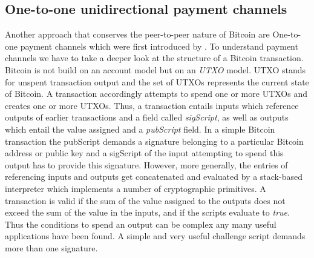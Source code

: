 \documentclass[10pt,journal,compsoc]{IEEEtran}
\begin{document}
\subsection{One-to-one unidirectional payment channels}
\label{sec:channels}
Another approach that conserves the peer-to-peer nature of Bitcoin are One-to-one payment channels which were first introduced by \cite{Hearn}. To understand payment channels we have to take a deeper look at the structure of a Bitcoin transaction. Bitcoin is not build on an account model but on an \emph{UTXO} model. UTXO stands for unspent transaction output and the set of UTXOs represents the current state of Bitcoin. A transaction accordingly attempts to spend one or more UTXOs and creates one or more UTXOs. Thus, a transaction entails inputs which reference outputs of earlier transactions and a field called \emph{sigScript}, as well as outputs which entail the value assigned and a \emph{pubScript} field. In a simple Bitcoin transaction the pubScript demands a signature belonging to a particular Bitcoin address or public key and a sigScript of the input attempting to spend this output has to provide this signature. However, more generally, the entries of referencing inputs and outputs get concatenated and evaluated by a stack-based interpreter which implements a number of cryptographic primitives. A transaction is valid if the sum of the value assigned to the outputs does not exceed the sum of the value in the inputs, and if the scripts evaluate to \emph{true}. Thus the conditions to spend an output can be complex any many useful applications have been found. A simple and very useful challenge script demands more than one signature.
\end{document}
